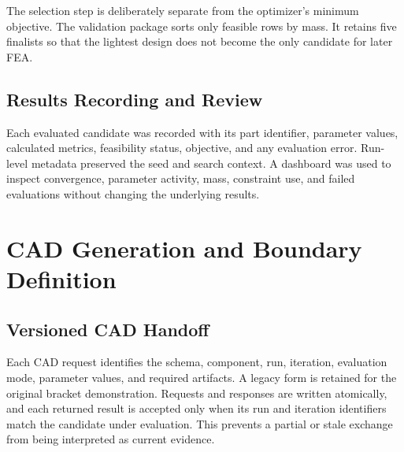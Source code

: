The selection step is deliberately separate from the optimizer's minimum
objective. The validation package sorts only feasible rows by mass. It retains
five finalists so that the lightest design does not become the only candidate
for later FEA.

\subsection{Results Recording and Review}
\label{sec:logging-method}

Each evaluated candidate was recorded with its part identifier, parameter
values, calculated metrics, feasibility status, objective, and any evaluation
error. Run-level metadata preserved the seed and search context. A dashboard
was used to inspect convergence, parameter activity, mass, constraint use, and
failed evaluations without changing the underlying results.

\section{CAD Generation and Boundary Definition}
\label{sec:cad-method}

\subsection{Versioned CAD Handoff}
\label{sec:fusion-bridge}

Each CAD request identifies the schema, component, run, iteration, evaluation
mode, parameter values, and required artifacts. A legacy form is retained for
the original bracket demonstration. Requests and responses are written
atomically, and each returned result is accepted only when its run and
iteration identifiers match the candidate under evaluation. This prevents a
partial or stale exchange from being interpreted as current evidence.

